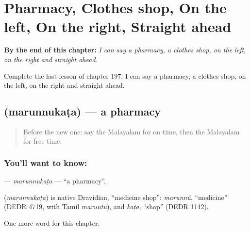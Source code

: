 
\chapter{Pharmacy, Clothes shop, On the left, On the right, Straight ahead}
\label{ch:ml-pharmacy-clothes-shop-on-the-left-on-the-right-straight-ahead}

\begin{chapteropening}
\textbf{By the end of this chapter:} \emph{I can say a pharmacy, a clothes shop, on the left, on the right and straight ahead.}

Complete the last lesson of chapter 197: I can say a pharmacy, a clothes shop, on the left, on the right and straight ahead.
\end{chapteropening}

\section[\texorpdfstring{\ml{മരുന്നുകട} (marunnukaṭa)}{മരുന്നുകട (marunnukaṭa)}]{ (marunnukaṭa) — a pharmacy}

\label{lesson:ML-C197-marunnukata}



\begin{quote}
Before the new one: say the Malayalam for on time, then the Malayalam for free time.
\end{quote}

\subsection*{You'll want to know: }
\textbf{} — \emph{marunnukaṭa} — \textquotedblleft{}a pharmacy\textquotedblright{}.

\begin{cousinweb}
\textbf{} (\emph{marunnukaṭa}) is native Dravidian, \textquotedblleft{}medicine shop\textquotedblright{}: \emph{marunnŭ}, \textquotedblleft{}medicine\textquotedblright{} (DEDR 4719, with Tamil \emph{maruntu}), and \emph{kaṭa}, \textquotedblleft{}shop\textquotedblright{} (DEDR 1142).
\end{cousinweb}

\begin{grammarlens}[title={What you've built}]
One more word for this chapter.
\end{grammarlens}

